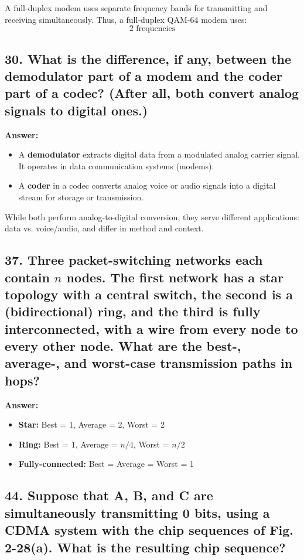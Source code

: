 \documentclass{article}
\begin{document}
A full-duplex modem uses separate frequency bands for transmitting and receiving simultaneously. Thus, a full-duplex QAM-64 modem uses:
\[
\boxed{2 \text{ frequencies}}
\]

\subsection*{30. What is the difference, if any, between the demodulator part of a modem and the coder part of a codec? (After all, both convert analog signals to digital ones.)}

\textbf{Answer:}

\begin{itemize}
  \item A \textbf{demodulator} extracts digital data from a modulated analog carrier signal. It operates in data communication systems (modems).
  \item A \textbf{coder} in a codec converts analog voice or audio signals into a digital stream for storage or transmission.
\end{itemize}

While both perform analog-to-digital conversion, they serve different applications: data vs. voice/audio, and differ in method and context.

\subsection*{37. Three packet-switching networks each contain $n$ nodes. The first network has a star topology with a central switch, the second is a (bidirectional) ring, and the third is fully interconnected, with a wire from every node to every other node. What are the best-, average-, and worst-case transmission paths in hops?}

\textbf{Answer:}

\begin{itemize}
  \item \textbf{Star:} Best = 1, Average = 2, Worst = 2
  \item \textbf{Ring:} Best = 1, Average = $n/4$, Worst = $n/2$
  \item \textbf{Fully-connected:} Best = Average = Worst = 1
\end{itemize}

\subsection*{44. Suppose that A, B, and C are simultaneously transmitting 0 bits, using a CDMA system with the chip sequences of Fig. 2-28(a). What is the resulting chip sequence?}
\end{document}
